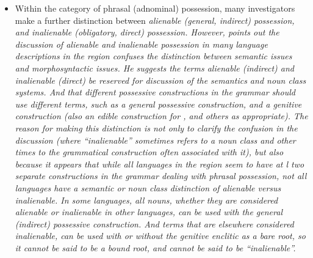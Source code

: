 \begin{itemize}
				 (\it{pig’ head}), whereas in Austronesian languages in the region,
				the “genitive” marker is indexed on the  (\it{fafu olo-} ‘pig head-’).
				While the marking is on different constituents,
				nevertheless the semantic relationship is exactly the same as
				in ‘\it{pig’s head}’ or ‘\it{head of pig}’.
				Furthermore, Indo-European languages tend to be predominantly
				dependent-marking, whereas the Austronesian languages in our target region tend
				to be predominantly head-marking,
				and consequently the genitive marking indexed on the 
				(dependent) in Indo-European languages,
				but on the  (head) in Austronesian languages in
				the region is entirely consistent with that distinction (see
				\citealp{Nichols1986,NicholsBickel2013}).
				Some investigators find the terms “genitive”
				and “possessive” useful for distinguishing two different grammatical
				constructions of phrasal possession (see below).
	\item Within the category of phrasal (adnominal) possession,
				many investigators make a further distinction between \it{alienable}
				(general, indirect) possession, and \it{inalienable} (obligatory, direct) possession.
				However, \citet{GrimesCIP} points out the discussion of \it{alienable}
				and \it{inalienable} possession in many language descriptions
				in the region confuses the distinction between semantic issues and morphosyntactic issues.
				He suggests the terms \it{alienable} (indirect)
				and \it{inalienable} (direct) be reserved for discussion of the
				semantics and noun class systems.
				And that different possessive constructions in the grammar should
				use different terms, such as a general \it{possessive} construction,
				and a \it{genitive} construction (also an \it{edible} construction
				for , and others as appropriate).
				The reason for making this distinction is not only to clarify
				the confusion in the discussion (where “inalienable” sometimes
				refers to a noun class
				and other times to the grammatical construction often associated
				with it), but also because it appears that while all languages in the region
				seem to have at l two separate constructions in the grammar
				dealing with phrasal possession,
				not all languages have a semantic or noun class distinction of alienable versus inalienable.
				In some languages, \it{all} nouns,
				whether they are considered alienable or inalienable in other
				languages, can be used with the general (indirect) possessive construction.
				And terms that are elsewhere considered inalienable,
				can be used with or without the genitive enclitic as a bare root,
				so it cannot be said to be a bound root,
				and cannot be said to be “inalienable”.
\end{itemize}

